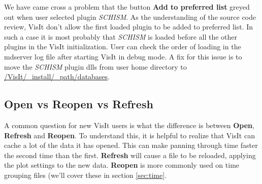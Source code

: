 \documentclass[12pt]{report}
\begin{document}
We have came cross a problem that the button {\bf Add to preferred list} greyed out when user selected plugin \emph{SCHISM}. As the understanding of the source code review, VisIt don't allow the first loaded plugin to be added to preferred list. In such a case it
is most probably that \emph{SCHISM} is loaded before all the other plugins in the VisIt initialization. User can check the order of
loading in the mdserver log file after starting VisIt in debug mode.  A fix for this issue is to move the \emph{SCHISM} plugin dlls
from user home directory to \url {/VisIt/_install/_path/databases}. 
				
\subsection{Open vs Reopen vs Refresh}
A common question for new VisIt users is what the difference is between {\bf Open}, {\bf Refresh} and {\bf Reopen}.
To understand this, it is helpful to realize that VisIt can cache a lot of the data it has opened. This can
make panning through time faster the second time than the first. {\bf Refresh} will cause a file to be reloaded,
applying the plot settings to the new data. {\bf Reopen} is more commonly used on time grouping files (we'll cover these
in section \ref{sec:time}.
        
\end{document}

